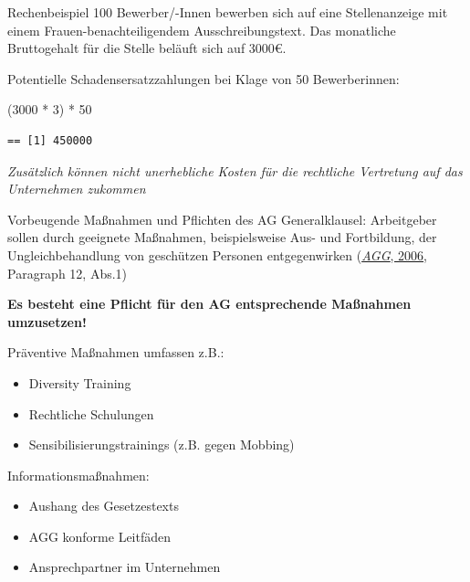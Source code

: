 \documentclass[
  10pt,
  ignorenonframetext,
]{beamer}
\newenvironment{Shaded}{\begin{snugshade}}{\end{snugshade}}
\newcommand{\DecValTok}[1]{\textcolor[rgb]{0.00,0.00,0.81}{#1}}
\newcommand{\NormalTok}[1]{#1}
\newcommand{\SpecialCharTok}[1]{\textcolor[rgb]{0.00,0.00,0.00}{#1}}
\providecommand{\tightlist}{%
  \setlength{\itemsep}{0pt}\setlength{\parskip}{0pt}}
\begin{document}
\begin{frame}[fragile]{Rechenbeispiel}
\protect\hypertarget{rechenbeispiel}{}
100 Bewerber/-Innen bewerben sich auf eine Stellenanzeige mit einem
Frauen-benachteiligendem Ausschreibungstext. Das monatliche Bruttogehalt
für die Stelle beläuft sich auf 3000€.

Potentielle Schadensersatzzahlungen bei Klage von 50 Bewerberinnen:

\begin{Shaded}
\begin{Highlighting}[]
\NormalTok{(}\DecValTok{3000} \SpecialCharTok{*} \DecValTok{3}\NormalTok{) }\SpecialCharTok{*} \DecValTok{50}
\end{Highlighting}
\end{Shaded}

\begin{verbatim}
== [1] 450000
\end{verbatim}

\emph{Zusätzlich können nicht unerhebliche Kosten für die rechtliche
Vertretung auf das Unternehmen zukommen}
\end{frame}

\begin{frame}{Vorbeugende Maßnahmen und Pflichten des AG}
\protect\hypertarget{vorbeugende-mauxdfnahmen-und-pflichten-des-ag}{}
Generalklausel: Arbeitgeber sollen durch geeignete Maßnahmen,
beispielsweise Aus- und Fortbildung, der Ungleichbehandlung von
geschützen Personen entgegenwirken
(\protect\hyperlink{ref-agg}{\emph{AGG}, 2006}, Paragraph 12, Abs.1)

\textbf{Es besteht eine Pflicht für den AG entsprechende Maßnahmen
umzusetzen!}

Präventive Maßnahmen umfassen z.B.:

\begin{itemize}
\tightlist
\item
  Diversity Training
\item
  Rechtliche Schulungen
\item
  Sensibilisierungstrainings (z.B. gegen Mobbing)
\end{itemize}

Informationsmaßnahmen:

\begin{itemize}
\tightlist
\item
  Aushang des Gesetzestexts
\item
  AGG konforme Leitfäden
\item
  Ansprechpartner im Unternehmen
\end{itemize}
\end{frame}
\end{document}
